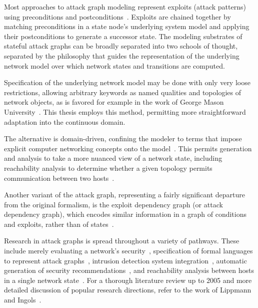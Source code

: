 Most approaches to attack graph modeling represent exploits (attack patterns) using
preconditions and postconditions~\cite{lippmann2005annotated, 
templeton2001requires}. Exploits are chained together by matching preconditions
in a state node's underlying system model and applying their postconditions to 
generate a successor state.
The modeling substrates of stateful attack graphs can be broadly separated into 
two schools of thought, separated by the philosophy that guides the representation of the underlying
network model over which network states and transitions are computed.

Specification of the underlying network model may be done with only very loose
restrictions, allowing arbitrary keywords as named qualities and topologies of 
network objects, as is favored for example in the work of George Mason 
University~\cite{ammann2002scalable, wang2006minimum}.
This thesis employs this method, permitting more straightforward adaptation 
into the continuous domain.

The alternative is domain-driven, confining the modeler to
terms that impose explicit computer networking 
concepts onto the model~\cite{templeton2001requires}.
This permits generation and analysis to take a
more nuanced view of a network state, including reachability analysis to determine whether a
given topology permits communication between two hosts~\cite{ingols2009modeling}.

Another variant of the attack graph, representing a fairly significant departure
from the original formalism, is the exploit dependency graph (or attack
dependency graph), which encodes similar information in a graph of conditions
and exploits, rather than of states~\cite{jajodia2005topological, 
noel2004managing, louthan2011toward}.

Research in attack graphs is spread throughout a variety of pathways. These include
merely evaluating a network's security~\cite{ammann2002scalable}, specification of formal languages
to represent attack graphs~\cite{templeton2001requires}, intrusion detection system 
integration~\cite{tidwell2001modeling}, automatic generation of security recommendations~\cite{wang2006minimum},
and reachability analysis between hosts in a single network state~\cite{ingols2009modeling}. 
For a thorough literature review up to 2005 and more detailed discussion of popular research directions, 
refer to the work of Lippmann and Ingols~\cite{lippmann2005annotated}.

